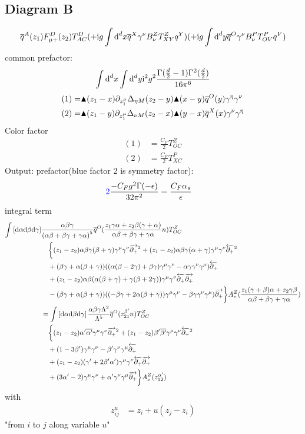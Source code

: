\subsection{Diagram B}
\begin{align}
\overline q^A(z_1) F_{\mu +}^D(z_2) T^D_{AC}   (+\text{i} g \int \text{d} ^d x \overline q^X \gamma^\nu B_\nu^Z T^Z_{XY} q^Y)(+\text{i} g \int \text{d} ^d y \overline q^O \gamma^\nu B_\nu^P T^P_{OV} q^V)
\end{align}
common prefactor:
\begin{align}
\int \text{d} ^d x \int \text{d} ^d y \text{i}^2 g^2 \frac{\Gamma(\frac{d}{2}-1)\Gamma^2(\frac{d}{2})}{16\pi^6}
\end{align}
\begin{align}
(1)=&\blacktriangle(z_1-x)\partial_{z_1^\mu}\Delta_{\eta M}(z_2-y)\blacktriangle(x-y)\overline q^O(y)\gamma^\eta \gamma^\nu
\\
(2)=&\blacktriangle(z_1-y)\partial_{z_1^\mu}\Delta_{\nu M}(z_2-x)\blacktriangle(y-x)\overline q^X(x)\gamma^\nu\gamma^\eta 
\end{align}
Color factor
\begin{align}
(1)&=\frac{C_F}{2} T^{Z}_{OC}
\\
(2)&=\frac{C_F}{2} T^{P}_{XC}
\end{align}
Output:
prefactor(blue factor 2 is symmetry factor):
\begin{align}
{\color{blue}2}\frac{ - C_F g^2 \Gamma(-\epsilon)}{32 \pi^2} &=\frac{ C_F \alpha_s}{\epsilon}
\end{align}
integral term
\begin{align}
\int \left[\text{d} \alpha \text{d} \beta \text{d} \gamma\right] &\frac{\alpha \beta \gamma}{\left(\alpha \beta + \beta \gamma + \gamma \alpha\right)^5} \overline q^O(\frac{z_1 \gamma\alpha +z_2 \beta (\gamma + \alpha)}{\alpha \beta + \beta \gamma + \gamma \alpha}n)T^{Z}_{OC}
\\&~~~
\bigg\{ (z_1-z_2)\alpha \beta\gamma (\beta + \gamma) \gamma^\mu \gamma^\nu \overrightarrow{\partial_+}^2 
+ (z_1-z_2)\alpha\beta\gamma (\alpha + \gamma) \gamma^\mu \gamma^\nu \overleftarrow{\partial_+}^2 
\\&~~~
+(\beta \gamma + \alpha (\beta +\gamma) )((\alpha(\beta-2\gamma)+\beta\gamma)\gamma^\mu \gamma^\nu -\alpha \gamma \gamma^\nu \gamma^\mu)\overleftarrow{\partial_+} 
\\&~~~
+ (z_1-z_2)\alpha\beta(\alpha(\beta+\gamma)+\gamma(\beta+2\gamma))\gamma^\mu \gamma^\nu \overleftarrow{\partial_+} \overrightarrow{\partial_+}
\\&~~~
-(\beta\gamma + \alpha (\beta +\gamma))( (-\beta\gamma+2\alpha (\beta+\gamma))\gamma^\mu \gamma^\nu  - \beta \gamma \gamma^\nu \gamma^\mu )\overrightarrow{\partial_+}
	 \bigg\}A^Z_\nu (\frac{z_1(\gamma +\beta)\alpha+z_2\gamma \beta}{\alpha \beta + \beta \gamma + \gamma \alpha}) 
\\
&=
\int \left[\text{d} \alpha \text{d} \beta \text{d} \gamma\right] \frac{\alpha \beta \gamma \Lambda^2}{\Lambda^5} \overline q^O(z_{21}^{\beta ' }n)T^{Z}_{OC}
\\&~~~
\bigg\{ (z_1-z_2)\alpha' \overline{\alpha'} \gamma^\mu \gamma^\nu \overrightarrow{\partial_+}^2 
+ (z_1-z_2)\beta' \overline{\beta '} \gamma^\mu \gamma^\nu \overleftarrow{\partial_+}^2 
\\&~~~
+(1-3\beta')\gamma^\mu \gamma^\nu -\beta' \gamma^\nu \gamma^\mu \overleftarrow{\partial_+} 
\\&~~~
+ (z_1-z_2)(\gamma' +2\beta'\alpha')\gamma^\mu \gamma^\nu \overleftarrow{\partial_+} \overrightarrow{\partial_+}
\\&~~~
+(3\alpha'-2)\gamma^\mu \gamma^\nu  + \alpha' \gamma^\nu \gamma^\mu \overrightarrow{\partial_+}
\bigg\}A^Z_\nu (z_{12}^{\alpha'}) 
\end{align}
with
\begin{align}
	z_{ij}^u
	&=
	z_i+u(z_j-z_i)
\end{align}
"from $i$ to $j$ along variable $u$"

